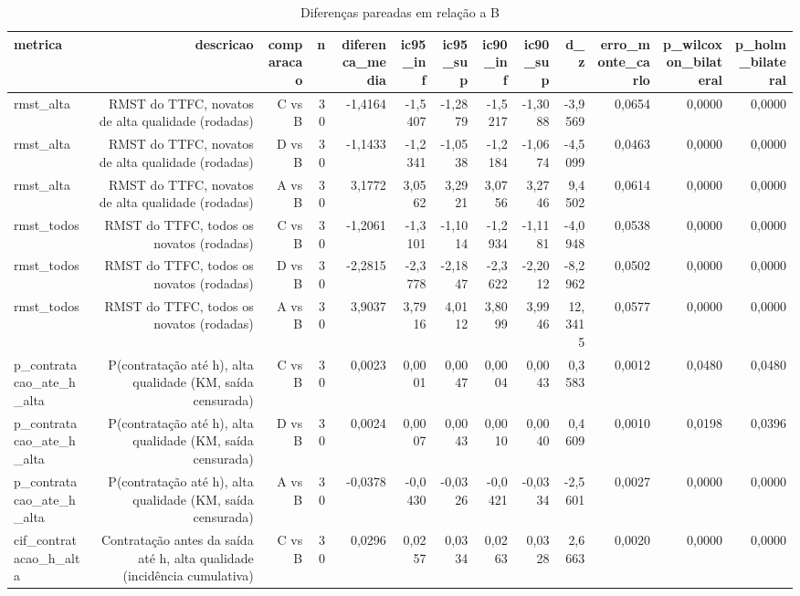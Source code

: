 \begin{table}[ht]
\centering
\caption{Diferenças pareadas em relação a B}
\label{tab:comparacoes}
\begin{tabular}{lrrrrrrrrrrrr}
\hline
\textbf{metrica} & \textbf{descricao} & \textbf{comparacao} & \textbf{n} & \textbf{diferenca\_media} & \textbf{ic95\_inf} & \textbf{ic95\_sup} & \textbf{ic90\_inf} & \textbf{ic90\_sup} & \textbf{d\_z} & \textbf{erro\_monte\_carlo} & \textbf{p\_wilcoxon\_bilateral} & \textbf{p\_holm\_bilateral} \\
\hline
rmst\_alta & RMST do TTFC, novatos de alta qualidade (rodadas) & C vs B & 30 & -1,4164 & -1,5407 & -1,2879 & -1,5217 & -1,3088 & -3,9569 & 0,0654 & 0,0000 & 0,0000 \\
rmst\_alta & RMST do TTFC, novatos de alta qualidade (rodadas) & D vs B & 30 & -1,1433 & -1,2341 & -1,0538 & -1,2184 & -1,0674 & -4,5099 & 0,0463 & 0,0000 & 0,0000 \\
rmst\_alta & RMST do TTFC, novatos de alta qualidade (rodadas) & A vs B & 30 & 3,1772 & 3,0562 & 3,2921 & 3,0756 & 3,2746 & 9,4502 & 0,0614 & 0,0000 & 0,0000 \\
rmst\_todos & RMST do TTFC, todos os novatos (rodadas) & C vs B & 30 & -1,2061 & -1,3101 & -1,1014 & -1,2934 & -1,1181 & -4,0948 & 0,0538 & 0,0000 & 0,0000 \\
rmst\_todos & RMST do TTFC, todos os novatos (rodadas) & D vs B & 30 & -2,2815 & -2,3778 & -2,1847 & -2,3622 & -2,2012 & -8,2962 & 0,0502 & 0,0000 & 0,0000 \\
rmst\_todos & RMST do TTFC, todos os novatos (rodadas) & A vs B & 30 & 3,9037 & 3,7916 & 4,0112 & 3,8099 & 3,9946 & 12,3415 & 0,0577 & 0,0000 & 0,0000 \\
p\_contratacao\_ate\_h\_alta & P(contratação até h), alta qualidade (KM, saída censurada) & C vs B & 30 & 0,0023 & 0,0001 & 0,0047 & 0,0004 & 0,0043 & 0,3583 & 0,0012 & 0,0480 & 0,0480 \\
p\_contratacao\_ate\_h\_alta & P(contratação até h), alta qualidade (KM, saída censurada) & D vs B & 30 & 0,0024 & 0,0007 & 0,0043 & 0,0010 & 0,0040 & 0,4609 & 0,0010 & 0,0198 & 0,0396 \\
p\_contratacao\_ate\_h\_alta & P(contratação até h), alta qualidade (KM, saída censurada) & A vs B & 30 & -0,0378 & -0,0430 & -0,0326 & -0,0421 & -0,0334 & -2,5601 & 0,0027 & 0,0000 & 0,0000 \\
cif\_contratacao\_h\_alta & Contratação antes da saída até h, alta qualidade (incidência cumulativa) & C vs B & 30 & 0,0296 & 0,0257 & 0,0334 & 0,0263 & 0,0328 & 2,6663 & 0,0020 & 0,0000 & 0,0000 \\

\end{tabular}
\end{table}
